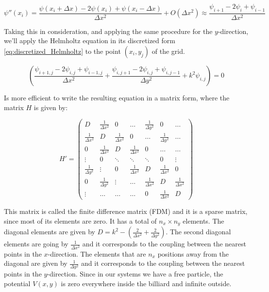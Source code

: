 \begin{equation}
    \psi''(x_i) = \frac{\psi(x_i + \Delta x) - 2\psi(x_i) + \psi(x_i - \Delta x)}{\Delta x^2} + O(\Delta x^2) \approx \frac{\psi_{i+1} - 2\psi_i + \psi_{i-1}}{\Delta x^2}
    \label{eq:aprox_2derivada_diffinita}
\end{equation}

Taking this in consideration, and applying the same procedure for the $y$-direction, we'll apply the Helmholtz equation in its discretized form \ref{eq:discretized_Helmholtz} to the point $(x_i, y_j)$ of the grid. 

\begin{equation}
    \left( \frac{\psi_{i+1,j} - 2\psi_{i,j} + \psi_{i-1,j}}{\Delta x^2} + \frac{\psi_{i,j+1} - 2\psi_{i,j} + \psi_{i,j-1}}{\Delta y^2} + k^2 \psi_{i,j} \right) = 0
    \label{eq:discretized_Helmholtz}
\end{equation}

Is more efficient to write the resulting equation in a matrix form, where the matrix $H$ is given by:

\begin{equation}
H' = 
\begin{pmatrix}
D      & \frac{1}{\Delta x^2} & 0      & \dots  & \frac{1}{\Delta y^2} & 0      & \dots \\
\frac{1}{\Delta x^2} & D      & \frac{1}{\Delta x^2} & 0      & \dots  & \frac{1}{\Delta y^2} & \dots \\
0      & \frac{1}{\Delta x^2} & D      & \frac{1}{\Delta x^2} & 0      & \dots  & \dots \\
\vdots & 0      & \ddots & \ddots & \ddots & 0      & \vdots \\
\frac{1}{\Delta y^2} & \vdots & 0      & \frac{1}{\Delta x^2} & D      & \frac{1}{\Delta x^2} & 0 \\
0      & \frac{1}{\Delta y^2} & \vdots & \dots  & \frac{1}{\Delta x^2} & D      & \frac{1}{\Delta x^2} \\
\vdots & \dots  & \dots  & \dots  & 0      & \frac{1}{\Delta x^2} & D      
\end{pmatrix}
\label{eq:sparse_matrix}
\end{equation}

This matrix is called the finite difference matrix (FDM) and it is a sparse matrix, since most of its elements are zero. It has a total of $n_x \times n_y$ elements. The diagonal elements are given by $D = k^2 -\left( \frac{2}{\Delta x^2} + \frac{2}{\Delta y^2} \right)$. The second diagonal elements are going by $\frac{1}{\Delta x^2}$ and it corresponds to the coupling between the nearest points in the $x$-direction. The elements that are $n_x$ positions away from the diagonal are given by $\frac{1}{\Delta y^2}$ and it corresponds to the coupling between the nearest points in the $y$-direction.
Since in our systems we have a free particle, the potential $V(x,y)$ is zero everywhere inside the billiard and infinite outside. 

